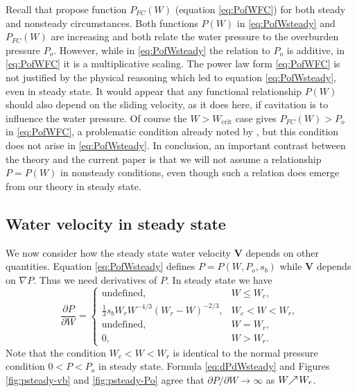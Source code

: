 \documentclass[11pt,final]{amsart}
\newcommand\bV{\mathbf{V}}
\newcommand{\grad}{\nabla}
\begin{document}
Recall that \cite{FlowersClarke2002_theory} propose function $P_{FC}(W)$ (equation \eqref{eq:PofWFC}) for both steady and nonsteady circumstances.  Both functions $P(W)$ in \eqref{eq:PofWsteady} and $P_{FC}(W)$ are increasing and both relate the water pressure to the overburden pressure $P_o$.  However, while in \eqref{eq:PofWsteady} the relation to $P_o$ is additive, in \eqref{eq:PofWFC} it is a multiplicative scaling.  The power law form \eqref{eq:PofWFC} is not justified by the physical reasoning which led to equation \eqref{eq:PofWsteady}, even in steady state.   It would appear that any functional relationship $P(W)$ should also depend on the sliding velocity, as it does here, if cavitation is to influence the water pressure.  Of course the $W>W_{\text{crit}}$ case gives $P_{FC}(W) > P_o$ in \eqref{eq:PofWFC}, a problematic condition already noted by \cite{Schoofetal2012}, but this condition does not arise in \eqref{eq:PofWsteady}.  In conclusion, an important contrast between the \cite{FlowersClarke2002_theory} theory and the current paper is that we will not assume a relationship $P=P(W)$ in nonsteady conditions, even though such a relation does emerge from our theory in steady state.

\subsection*{Water velocity in steady state}  We now consider how the steady state water velocity $\bV$ depends on other quantities.  Equation \eqref{eq:PofWsteady} defines $P=P(W,P_o,s_b)$ while $\bV$ depends on $\grad P$.  Thus we need derivatives of $P$.  In steady state we have
\begin{equation}
\frac{\partial P}{\partial W} =
    \begin{cases}
      \text{undefined}, & W \le W_c, \\
      \frac{1}{3} s_b W_r W^{-4/3} (W_r - W)^{-2/3}, & W_c < W < W_r, \\
      \text{undefined}, & W = W_r, \\
      0, & W > W_r.
    \end{cases}  \label{eq:dPdWsteady}
\end{equation}
Note that the condition $W_c < W < W_r$ is identical to the normal pressure condition $0 < P < P_o$ in steady state.  Formula \eqref{eq:dPdWsteady} and Figures \ref{fig:psteady-vb} and \ref{fig:psteady-Po} agree that $\partial P / \partial W \to \infty$ as $W \!\!\nearrow\! W_r$.  
\end{document}
